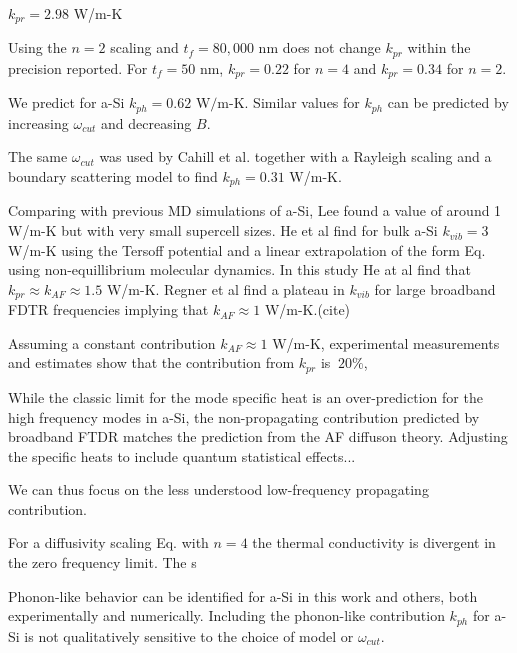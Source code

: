 \documentclass[aps,prb,onecolumn,preprint,superscriptaddress,footinbib,amsmath,amssymb,floatfix]{revtex4}
\begin{document}
$k_{pr} = 2.98$ W/m-K

Using the $n=2$ scaling and $t_f = 80,000$ nm does not change 
$k_{pr}$ within the precision reported. For $t_f = 50$ nm, 
$k_{pr} = 0.22$ for $n=4$ and $k_{pr} = 0.34$ for $n=2$. 






We predict for a-Si $k_{ph} = 0.62$ 
W$/$m-K. Similar values for $k_{ph}$ can be predicted by increasing 
$\omega_{cut}$ and decreasing $B$. 

The same $\omega_{cut}$ was used by Cahill et al. 
together with a Rayleigh scaling and a boundary scattering model to 
find $k_{ph} = 0.31$ W/m-K.\cite{cahill_thermal_1994} 

Comparing with previous MD simulations of a-Si, 
Lee found a value of around 1 W/m-K 
but with very small supercell sizes.\cite{lee_molecular-dynamics_1991}
He et al find for bulk a-Si $k_{vib} = 3$ W/m-K using the Tersoff 
potential and a linear extrapolation of the form Eq. using 
non-equillibrium molecular dynamics. In this study He at al find 
that $k_{pr} \approx k_{AF} \approx 1.5$ W/m-K.  Regner et al find 
a plateau in $k_{vib}$ for large broadband FDTR frequencies 
implying that $k_{AF} \approx 1$ W/m-K.(cite) 


Assuming a constant contribution  
$k_{AF} \approx 1$ W/m-K, experimental 
measurements and estimates show that the contribution from 
$k_{pr}$ is $~20\%$,


While the classic limit for the mode specific heat is 
an over-prediction for the high frequency modes in a-Si, 
the non-propagating contribution 
predicted by broadband FTDR matches the prediction from the AF 
diffuson theory. Adjusting the specific heats to include quantum 
statistical effects...

We can thus focus on the less understood low-frequency propagating contribution. 


For a diffusivity scaling Eq. with $n=4$ the thermal conductivity 
is divergent in the zero frequency limit. The s

















Phonon-like behavior 
can be identified for a-Si in this work and others, 
both experimentally
\cite{liu_high_2009,yang_anomalously_2010,minnich_thermal_2011,
regner_broadband_2013} 
and numerically.
\cite{feldman_thermal_1993,feldman_numerical_1999,
mcgaughey_thermal_2004,he_heat_2011} 
Including the phonon-like contribution $k_{ph}$ 
for a-Si is not qualitatively sensitive 
to the choice of model
\cite{feldman_thermal_1993,feldman_numerical_1999,liu_high_2009} 
or $\omega_{cut}$.
\cite{feldman_thermal_1993,feldman_numerical_1999,
donadio_atomistic_2009,liu_high_2009,yang_anomalously_2010}
\end{document}
